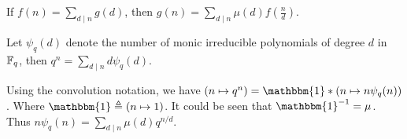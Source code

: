 \begin{theorem}
  If $f(n) = \sum\limits_{d \mid n} g(d)$, then
  $g(n) = \sum\limits_{d \mid n} \mu(d) f\left(\frac{n}{d}\right)$.
\end{theorem}

\begin{remark}
  Let $\psi_q(d)$ denote the number of monic irreducible polynomials of degree $d$
  in $\mathbb{F}_q$, then $q^n = \sum_{d \mid n} d \psi_q(d)$.

  Using the convolution notation, we have $(n \mapsto q^n) = \mathbbm{1} * (n \mapsto n \psi_q(n))$.
  Where $\mathbbm{1} \triangleq (n \mapsto 1)$. It could be seen that $\mathbbm{1}^{-1} = \mu$.
  Thus $n \psi_q(n) = \sum_{d \mid n} \mu(d) q^{n/d}$.
\end{remark}

